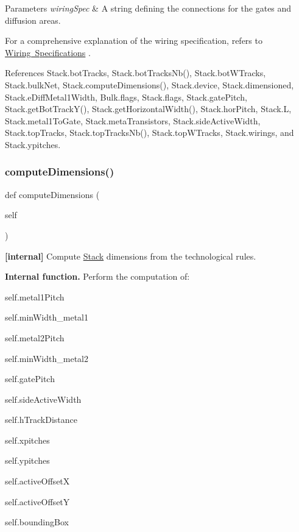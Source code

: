 \begin{DoxyParams}{Parameters}
{\em wiring\+Spec} & A string defining the connections for the gates and diffusion areas.\\
\hline
\end{DoxyParams}
For a comprehensive explanation of the wiring specification, refers to \mbox{\hyperlink{classpython_1_1stack_1_1Stack_secWiringSpecs}{Wiring Specifications}} . 

References Stack.\+bot\+Tracks, Stack.\+bot\+Tracks\+Nb(), Stack.\+bot\+W\+Tracks, Stack.\+bulk\+Net, Stack.\+compute\+Dimensions(), Stack.\+device, Stack.\+dimensioned, Stack.\+e\+Diff\+Metal1\+Width, Bulk.\+flags, Stack.\+flags, Stack.\+gate\+Pitch, Stack.\+get\+Bot\+Track\+Y(), Stack.\+get\+Horizontal\+Width(), Stack.\+hor\+Pitch, Stack.\+L, Stack.\+metal1\+To\+Gate, Stack.\+meta\+Transistors, Stack.\+side\+Active\+Width, Stack.\+top\+Tracks, Stack.\+top\+Tracks\+Nb(), Stack.\+top\+W\+Tracks, Stack.\+wirings, and Stack.\+ypitches.

\mbox{\label{classpython_1_1stack_1_1Stack_a74ff17e974efecc28c792db05b5d3eb0}} 
\subsubsection{\texorpdfstring{compute\+Dimensions()}{computeDimensions()}}
{\footnotesize\ttfamily def compute\+Dimensions (\begin{DoxyParamCaption}\item[{}]{self }\end{DoxyParamCaption})}



{\bfseries \mbox{[}internal\mbox{]}} Compute \mbox{\hyperlink{classpython_1_1stack_1_1Stack}{Stack}} dimensions from the technological rules. 

{\bfseries Internal function.} Perform the computation of\+:
\begin{DoxyItemize}
\item {\ttfamily self.\+metal1\+Pitch} 
\item {\ttfamily self.\+min\+Width\+\_\+metal1} 
\item {\ttfamily self.\+metal2\+Pitch} 
\item {\ttfamily self.\+min\+Width\+\_\+metal2} 
\item {\ttfamily self.\+gate\+Pitch} 
\item {\ttfamily self.\+side\+Active\+Width} 
\item {\ttfamily self.\+h\+Track\+Distance} 
\item {\ttfamily self.\+xpitches} 
\item {\ttfamily self.\+ypitches} 
\item {\ttfamily self.\+active\+OffsetX} 
\item {\ttfamily self.\+active\+OffsetY} 
\item {\ttfamily self.\+bounding\+Box} 
\end{DoxyItemize}

